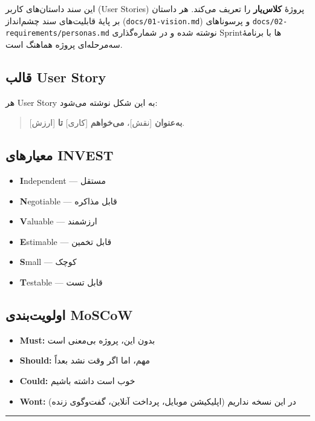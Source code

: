 \documentclass[12pt, a4paper]{article}
\begin{document}
این سند داستان‌های کاربر (User Stories) پروژهٔ \textbf{کلاس‌یار} را تعریف می‌کند.
هر داستان بر پایهٔ قابلیت‌های سند چشم‌انداز (\texttt{docs/01-vision.md}) و
پرسوناهای \texttt{docs/02-requirements/personas.md} نوشته شده و در شماره‌گذاری Sprintها
با برنامهٔ سه‌مرحله‌ای پروژه هماهنگ است.

\subsection{قالب User Story}

هر User Story به این شکل نوشته می‌شود:

\begin{quote}
\textbf{به‌عنوان} {[}نقش{]}، \textbf{می‌خواهم} {[}کاری{]} \textbf{تا} {[}ارزش{]}.
\end{quote}

\subsection{معیارهای INVEST}

\begin{itemize}
\tightlist
\item
  \textbf{I}ndependent — مستقل
\item
  \textbf{N}egotiable — قابل مذاکره
\item
  \textbf{V}aluable — ارزشمند
\item
  \textbf{E}stimable — قابل تخمین
\item
  \textbf{S}mall — کوچک
\item
  \textbf{T}estable — قابل تست
\end{itemize}

\subsection{اولویت‌بندی MoSCoW}

\begin{itemize}
\tightlist
\item
  \textbf{Must:} بدون این، پروژه بی‌معنی است
\item
  \textbf{Should:} مهم، اما اگر وقت نشد بعداً
\item
  \textbf{Could:} خوب است داشته باشیم
\item
  \textbf{Won\textquotesingle t:} در این نسخه نداریم (اپلیکیشن موبایل، پرداخت آنلاین، گفت‌وگوی زنده)
\end{itemize}

\begin{center}\rule{0.5\linewidth}{0.5pt}\end{center}
\end{document}
